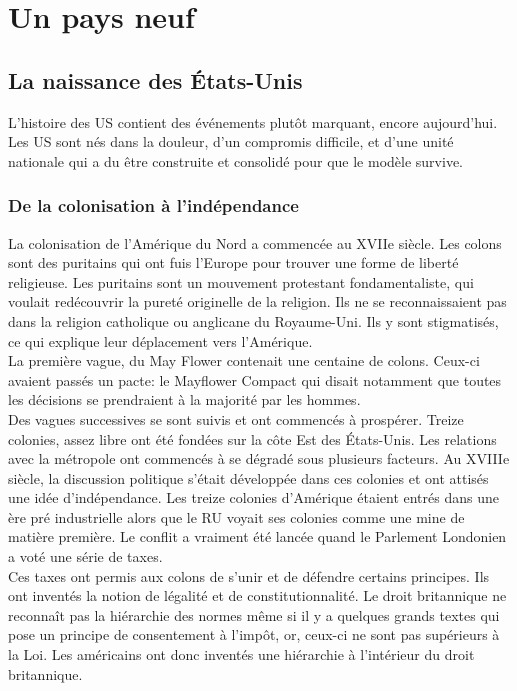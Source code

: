 \documentclass[10pt, a4paper, openany]{book}
\begin{document}
\section{Un pays neuf}

\subsection{La naissance des États-Unis}

L'histoire des US contient des événements plutôt marquant, encore aujourd'hui. Les US sont nés dans la douleur, d'un compromis difficile, et d'une unité nationale qui a du être construite et consolidé pour que le modèle survive. 

\subsubsection{De la colonisation à l'indépendance}

La colonisation de l'Amérique du Nord a commencée au XVIIe siècle. Les colons sont des puritains qui ont fuis l'Europe pour trouver une forme de liberté religieuse. Les puritains sont un mouvement protestant fondamentaliste, qui voulait redécouvrir la pureté originelle de la religion. Ils ne se reconnaissaient pas dans la religion catholique ou anglicane du Royaume-Uni. Ils y sont stigmatisés, ce qui explique leur déplacement vers l'Amérique. \\
La première vague, du May Flower contenait une centaine de colons. Ceux-ci avaient passés un pacte: le Mayflower Compact qui disait notamment que toutes les décisions se prendraient à la majorité par les hommes. \\
Des vagues successives se sont suivis et ont commencés à prospérer. Treize colonies, assez libre ont été fondées sur la côte Est des États-Unis. Les relations avec la métropole ont commencés à se dégradé sous plusieurs facteurs. Au XVIIIe siècle, la discussion politique s'était développée dans ces colonies et ont attisés une idée d'indépendance. Les treize colonies d'Amérique étaient entrés dans une ère pré industrielle alors que le RU voyait ses colonies comme une mine de matière première. Le conflit a vraiment été lancée quand le Parlement Londonien a voté une série de taxes. \\
Ces taxes ont permis aux colons de s'unir et de défendre certains principes. Ils ont inventés la notion de légalité et de constitutionnalité. Le droit britannique ne reconnaît pas la hiérarchie des normes même si il y a quelques grands textes qui pose un principe de consentement à l'impôt, or, ceux-ci ne sont pas supérieurs à la Loi. Les américains ont donc inventés une hiérarchie à l'intérieur du droit britannique.
\end{document}
